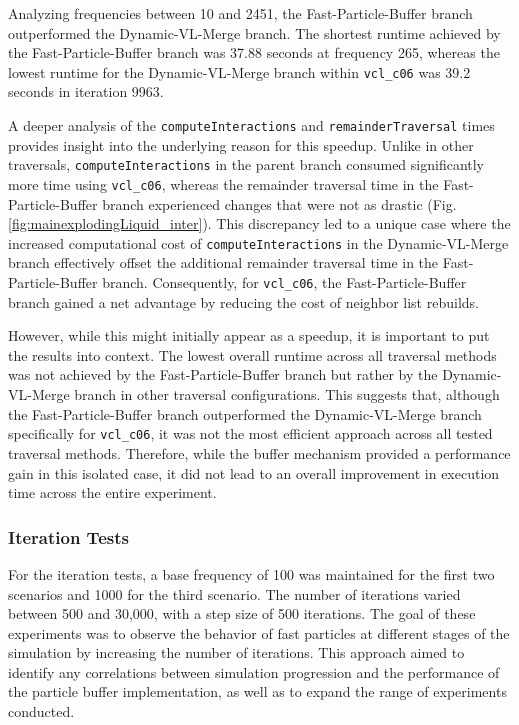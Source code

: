 Analyzing frequencies between 10 and 2451, the Fast-Particle-Buffer branch outperformed the Dynamic-VL-Merge branch. The shortest runtime achieved by the Fast-Particle-Buffer branch was 37.88 seconds at frequency 265, whereas the lowest runtime for the Dynamic-VL-Merge branch within \texttt{vcl\_c06} was 39.2 seconds in iteration 9963. 


A deeper analysis of the \texttt{computeInteractions} and \texttt{remainderTraversal} times provides insight into the underlying reason for this speedup. Unlike in other traversals, \texttt{computeInteractions} in the parent branch consumed significantly more time using \texttt{vcl\_c06}, whereas the remainder traversal time in the Fast-Particle-Buffer branch experienced changes that were not as drastic (Fig. \ref{fig:mainexplodingLiquid_inter}). This discrepancy led to a unique case where the increased computational cost of \texttt{computeInteractions} in the Dynamic-VL-Merge branch effectively offset the additional remainder traversal time in the Fast-Particle-Buffer branch. Consequently, for \texttt{vcl\_c06}, the Fast-Particle-Buffer branch gained a net advantage by reducing the cost of neighbor list rebuilds.

However, while this might initially appear as a speedup, it is important to put the results into context. The lowest overall runtime across all traversal methods was not achieved by the Fast-Particle-Buffer branch but rather by the Dynamic-VL-Merge branch in other traversal configurations. This suggests that, although the Fast-Particle-Buffer branch outperformed the Dynamic-VL-Merge branch specifically for \texttt{vcl\_c06}, it was not the most efficient approach across all tested traversal methods. Therefore, while the buffer mechanism provided a performance gain in this isolated case, it did not lead to an overall improvement in execution time across the entire experiment.




\subsubsection{Iteration Tests}


For the iteration tests, a base frequency of 100 was maintained for the first two scenarios and 1000 for the third scenario. The number of iterations varied between 500 and 30,000, with a step size of 500 iterations. The goal of these experiments was to observe the behavior of fast particles at different stages of the simulation by increasing the number of iterations. This approach aimed to identify any correlations between simulation progression and the performance of the particle buffer implementation, as well as to expand the range of experiments conducted.

